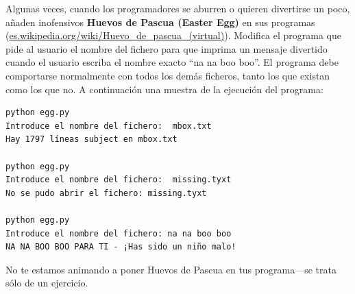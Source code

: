 \begin{ex}
Algunas veces, cuando los programadores se aburren o quieren divertirse un poco,
añaden inofensivos {\bf Huevos de Pascua (Easter Egg)} en sus programas
(\url{es.wikipedia.org/wiki/Huevo_de_pascua_(virtual)}). Modifica el programa
que pide al usuario el nombre del fichero para que imprima un mensaje
divertido cuando el usuario escriba el nombre exacto ``na na boo boo''.
El programa debe comportarse normalmente con todos los demás ficheros,
tanto los que existan como los que no. A continuación una muestra de la ejecución
del programa:

\beforeverb
\begin{verbatim}
python egg.py 
Introduce el nombre del fichero:  mbox.txt
Hay 1797 líneas subject en mbox.txt

python egg.py 
Introduce el nombre del fichero:  missing.tyxt
No se pudo abrir el fichero: missing.tyxt

python egg.py 
Introduce el nombre del fichero: na na boo boo
NA NA BOO BOO PARA TI - ¡Has sido un niño malo!
\end{verbatim}
\afterverb
%
No te estamos animando a poner Huevos de Pascua en tus
programa---se trata sólo de un ejercicio.

\end{ex}